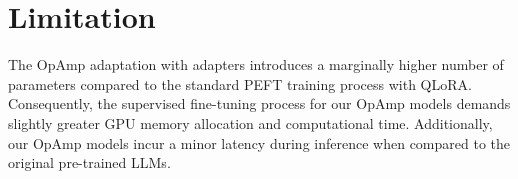 \section*{Limitation}
The OpAmp adaptation with adapters introduces a marginally higher number of parameters compared to the standard PEFT training process with QLoRA. 
Consequently, the supervised fine-tuning process for our OpAmp models demands slightly greater GPU memory allocation and computational time. 
Additionally, our OpAmp models incur a minor latency during inference when compared to the original pre-trained LLMs.